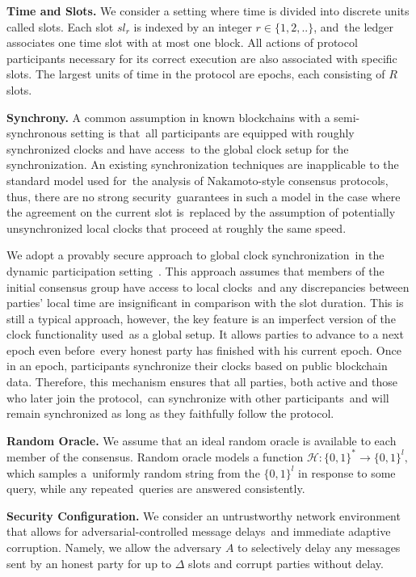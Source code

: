 \textbf{Time and Slots.}
We consider a setting where time is divided into discrete units called slots.
Each slot $sl_r$ is indexed by an integer $r \in \{1, 2, ..\}$, and\
the ledger associates one time slot with at most one block.
All actions of protocol participants necessary for its correct execution are also associated with specific slots.
The largest units of time in the protocol are epochs, each consisting of $R$ slots.

\textbf{Synchrony.}
A common assumption in known blockchains with a semi-synchronous setting is that\
all participants are equipped with roughly synchronized clocks and have access\
to the global clock setup for the synchronization.
An existing synchronization techniques are inapplicable to the standard model used for\
the analysis of Nakamoto-style consensus protocols, thus, there are no strong security\
guarantees in such a model in the case where the agreement on the current slot is\
replaced by the assumption of potentially unsynchronized local clocks that proceed at roughly the same speed.

We adopt a provably secure approach to global clock synchronization\
in the dynamic participation setting~\cite{cryptoeprint:2019/838}.
This approach assumes that members of the initial consensus group have access to local clocks\
and any discrepancies between parties' local time are insignificant in comparison with the slot duration.
This is still a typical approach, however, the key feature is an imperfect version of the clock functionality used\
as a global setup.
It allows parties to advance to a next epoch even before\
every honest party has finished with his current epoch.
Once in an epoch, participants synchronize their clocks based on public blockchain data.
Therefore, this mechanism ensures that all parties, both active and those who later join the protocol,\
can synchronize with other participants\
and will remain synchronized as long as they faithfully follow the protocol.

\textbf{Random Oracle.}
We assume that an ideal random oracle is available to each member of the consensus.
Random oracle models a function ${\mathcal{H} : \{0, 1\}^* \rightarrow \{0, 1\}^l, }$ which samples a\
uniformly random string from the ${\{0, 1\}^l}$ in response to some query, while any repeated\
queries are answered consistently.

\textbf{Security Configuration.}
We consider an untrustworthy network environment that allows for adversarial-controlled message delays\
and immediate adaptive corruption.
Namely, we allow the adversary $A$ to selectively delay any messages sent
by an honest party for up to $\Delta$ slots and corrupt parties without delay.

